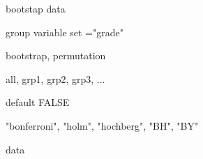 \documentclass[a4paper]{book}
\begin{document}
%
\begin{Arguments}
\begin{ldescription}
\item[\code{plspm\_boot}] bootstap data

\item[\code{group}] group variable set ="grade"

\item[\code{method}] bootstrap, permutation

\item[\code{type}] all, grp1, grp2, grp3, ...

\item[\code{adjust}] default FALSE

\item[\code{adjust.method}] "bonferroni", "holm", "hochberg", "BH", "BY"
\end{ldescription}
\end{Arguments}
%
\begin{Value}
data
\end{Value}
%
\end{document}
